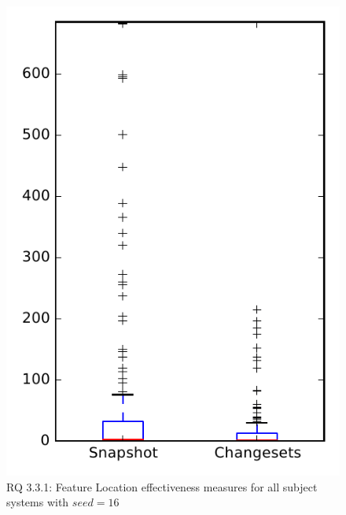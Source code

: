
\begin{figure}
\centering
\includegraphics[height=0.4\textheight]{figures/flt_seed/rq1_overview_16}
\caption{RQ 3.3.1: Feature Location effectiveness measures for all subject systems with $seed=16$}
\label{fig:flt_seed:rq1:overview}
\end{figure}
